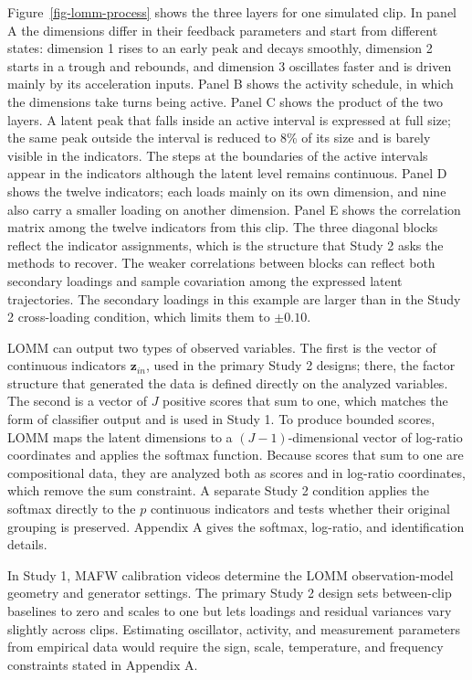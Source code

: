 \documentclass[
]{article}
\begin{document}
Figure~\ref{fig-lomm-process} shows the three layers for one simulated
clip. In panel A the dimensions differ in their feedback parameters and
start from different states: dimension 1 rises to an early peak and
decays smoothly, dimension 2 starts in a trough and rebounds, and
dimension 3 oscillates faster and is driven mainly by its acceleration
inputs. Panel B shows the activity schedule, in which the dimensions
take turns being active. Panel C shows the product of the two layers. A
latent peak that falls inside an active interval is expressed at full
size; the same peak outside the interval is reduced to 8\% of its size
and is barely visible in the indicators. The steps at the boundaries of
the active intervals appear in the indicators although the latent level
remains continuous. Panel D shows the twelve indicators; each loads
mainly on its own dimension, and nine also carry a smaller loading on
another dimension. Panel E shows the correlation matrix among the twelve
indicators from this clip. The three diagonal blocks reflect the
indicator assignments, which is the structure that Study 2 asks the
methods to recover. The weaker correlations between blocks can reflect
both secondary loadings and sample covariation among the expressed
latent trajectories. The secondary loadings in this example are larger
than in the Study 2 cross-loading condition, which limits them to
\(\pm 0.10\).

LOMM can output two types of observed variables. The first is the vector
of continuous indicators \(\mathbf z_{in}\), used in the primary Study 2
designs; there, the factor structure that generated the data is defined
directly on the analyzed variables. The second is a vector of \(J\)
positive scores that sum to one, which matches the form of classifier
output and is used in Study 1. To produce bounded scores, LOMM maps the
latent dimensions to a \((J-1)\)-dimensional vector of log-ratio
coordinates and applies the softmax function. Because scores that sum to
one are compositional data, they are analyzed both as scores and in
log-ratio coordinates, which remove the sum constraint. A separate Study
2 condition applies the softmax directly to the \(p\) continuous
indicators and tests whether their original grouping is preserved.
Appendix A gives the softmax, log-ratio, and identification details.

In Study 1, MAFW calibration videos determine the LOMM observation-model
geometry and generator settings. The primary Study 2 design sets
between-clip baselines to zero and scales to one but lets loadings and
residual variances vary slightly across clips. Estimating oscillator,
activity, and measurement parameters from empirical data would require
the sign, scale, temperature, and frequency constraints stated in
Appendix A.
\end{document}
